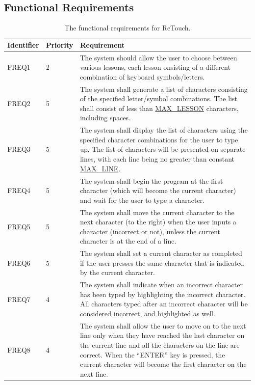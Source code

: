 \documentclass[12pt, titlepage]{article}
\begin{document}
\subsection{Functional Requirements}

\begin{longtable}{ |m{2cm}|m{1.8cm}|m{9.4cm}| }
\caption{The functional requirements for ReTouch.} \\
    \hline
    \textbf{Identifier} & \textbf{Priority} & \textbf{Requirement} \\ 
    \hline
    FREQ1 & 2 & The system should allow the user to choose between various lessons, each lesson onsisting of a different combination of keyboard symbols/letters. \\ 
    \hline
    FREQ2 & 5 & The system shall generate a list of characters consisting of the specified letter/symbol combinations. The list shall consist of less than \hyperref[symbols]{MAX\_LESSON} characters, including spaces. \\ 
    \hline
    FREQ3 & 5 & The system shall display the list of characters using the specified character combinations for the user to type up. The list of characters will be presented on separate lines, with each line being no greater than constant \hyperref[symbols]{MAX\_LINE}.  \\ 
    \hline
    FREQ4 & 5 & The system shall begin the program at the first character (which will become the current character) and wait for the user to type a character. \\ 
    \hline
    FREQ5 & 5 & The system shall move the current character to the next character (to the right) when the user inputs a character (incorrect or not), unless the current character is at the end of a line.  \\ 
    \hline
    FREQ6 & 5 & The system shall set a current character as completed if the user presses the same character that is indicated by the current character. \\ 
    \hline
    FREQ7 & 4 & The system shall indicate when an incorrect character has been typed by highlighting the incorrect character. All characters typed after an incorrect character will be considered incorrect, and highlighted as well. \\ 
    \hline
    FREQ8 & 4 & The system shall allow the user to move on to the next line only when they have reached the last character on the current line and all the characters on the line are correct. When the “ENTER” key is pressed, the current character will become the first character on the next line. \\ 

\end{longtable}
\end{document}
